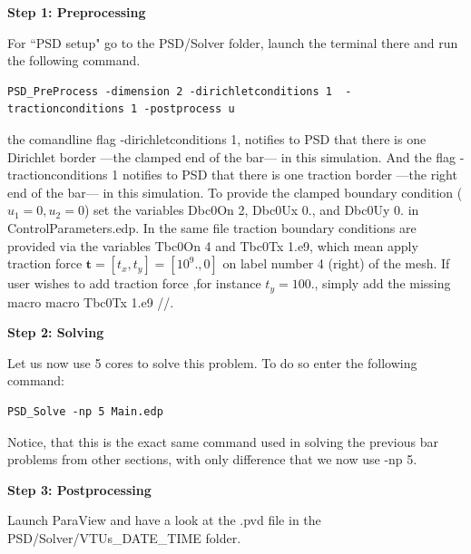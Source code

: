 \textbf{Step 1: Preprocessing}

For ``PSD setup" go to the {\ttfamily PSD/Solver} folder, launch the terminal there and run the following command.
\begin{lstlisting}[style=Linux]
PSD_PreProcess -dimension 2 -dirichletconditions 1  -tractionconditions 1 -postprocess u
\end{lstlisting}
%
the comandline flag {\ttfamily -dirichletconditions 1}, notifies to PSD that there is one Dirichlet border ---the clamped end of the bar--- in this simulation. And the flag {\ttfamily -tractionconditions 1} notifies to PSD that there is one traction border ---the right end of the bar--- in this simulation. 
To provide the clamped boundary condition ($u_1=0,u_2=0$) set the variables  {\ttfamily Dbc0On 2}, {\ttfamily Dbc0Ux 0.}, and {\ttfamily Dbc0Uy 0.} in {\ttfamily ControlParameters.edp}. In the same file traction boundary conditions are provided via the variables {\ttfamily Tbc0On 4} and {\ttfamily Tbc0Tx 1.e9}, which mean apply traction force $\mathbf t=[t_x,t_y]=[10^9.,0]$ on label number 4 (right) of the mesh. If user wishes to add traction force ,for instance $t_y=100.$, simply add the missing macro {\ttfamily macro Tbc0Tx 1.e9 //}.


\textbf{Step 2: Solving}

Let us now use 5 cores to solve this problem. To do so enter the following command:

\begin{lstlisting}[style=Linux]
PSD_Solve -np 5 Main.edp
\end{lstlisting}
%
Notice, that this is the exact same command used in solving the previous bar problems from other sections, with only difference that we now use {\ttfamily -np 5}.


\textbf{Step 3: Postprocessing}

Launch ParaView and have a look at the  {\ttfamily .pvd} file in the  {\ttfamily PSD/Solver/VTUs\_DATE\_TIME} folder. 

